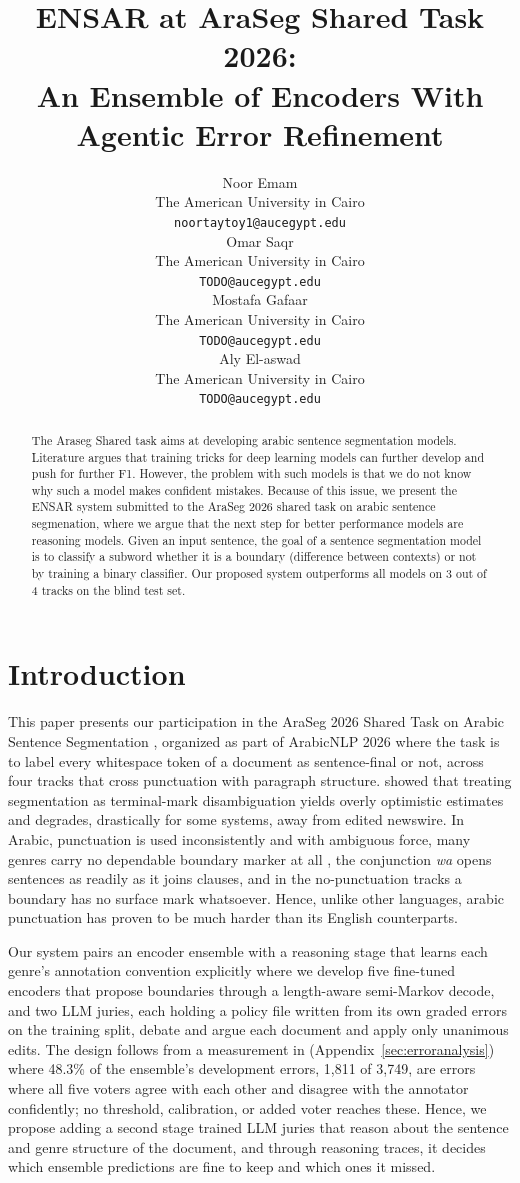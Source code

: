 \documentclass[11pt]{article}
\title{ENSAR at AraSeg Shared Task 2026: \\ An Ensemble of Encoders With Agentic Error Refinement}
\author{Noor Emam \\
  The American University in Cairo \\
  \texttt{noortaytoy1@aucegypt.edu} \\\And
  Omar Saqr \\
  The American University in Cairo \\
  \texttt{TODO@aucegypt.edu} \\\AND %
  Mostafa Gafaar \\
  The American University in Cairo \\
  \texttt{TODO@aucegypt.edu} \\\And %
  Aly El-aswad \\
  The American University in Cairo \\
  \texttt{TODO@aucegypt.edu} \\} %
\begin{document}
\maketitle
\begin{abstract}
The Araseg Shared task aims at developing arabic sentence segmentation models. Literature argues that training tricks for deep learning models can further develop and push for further F1. However, the problem with such models is that we do not know why such a model makes confident mistakes. Because of this issue, we present the ENSAR system submitted to the AraSeg 2026 shared task on arabic sentence segmenation, where we argue that the next step for better performance models are reasoning models. Given an input sentence, the goal of a sentence segmentation model is to classify a subword whether it is a boundary (difference between contexts) or not by training a binary classifier. Our proposed system outperforms all models on 3 out of 4 tracks on the blind test set.
\end{abstract}
\section{Introduction}
This paper presents our participation in the AraSeg 2026 Shared Task on Arabic
Sentence Segmentation \citep{elkholy-etal-2026-araseg-shared-task}, organized as part
of ArabicNLP 2026 where the task is to label every whitespace token of a document as sentence-final or
not, across four tracks that cross punctuation with paragraph structure. \citet{read2012sentence} showed that
treating segmentation as terminal-mark disambiguation yields overly optimistic
estimates and degrades, drastically for some systems, away from edited newswire. In
Arabic, punctuation is used inconsistently and with ambiguous force, many genres carry
no dependable boundary marker at all
\citep{elkholy2026arabicsentencesegmentationgenres}, the conjunction \textit{wa} opens
sentences as readily as it joins clauses, and in the no-punctuation tracks a boundary
has no surface mark whatsoever. Hence, unlike other languages, arabic punctuation has proven to be much harder than its English counterparts.

Our system pairs an encoder ensemble with a reasoning stage that learns each genre's
annotation convention explicitly where we develop five fine-tuned encoders that propose boundaries through
a length-aware semi-Markov decode, and two LLM juries, each holding a policy file
written from its own graded errors on the training split, debate and argue each document and
apply only unanimous edits. The design follows from a measurement in
(Appendix~\ref{sec:erroranalysis}) where 48.3\% of the ensemble's development errors,
1{,}811 of 3{,}749, are errors where all five voters agree with each other and disagree
with the annotator confidently; no threshold, calibration, or added voter reaches these. Hence, we propose adding a second stage trained LLM juries that reason about the sentence and genre structure of the document, and through reasoning traces, it decides which ensemble predictions are fine to keep and which ones it missed.
\end{document}
